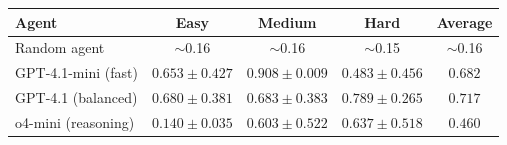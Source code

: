 \begin{tabular}{lcccc}
\toprule
\textbf{Agent} & \textbf{Easy} & \textbf{Medium} & \textbf{Hard} & \textbf{Average} \\
\midrule
Random agent & $\sim$0.16 & $\sim$0.16 & $\sim$0.15 & $\sim$0.16 \\
GPT-4.1-mini (fast) & $0.653\pm0.427$ & $0.908\pm0.009$ & $0.483\pm0.456$ & $0.682$ \\
GPT-4.1 (balanced) & $0.680\pm0.381$ & $0.683\pm0.383$ & $0.789\pm0.265$ & $0.717$ \\
o4-mini (reasoning) & $0.140\pm0.035$ & $0.603\pm0.522$ & $0.637\pm0.518$ & $0.460$ \\
\bottomrule
\end{tabular}

